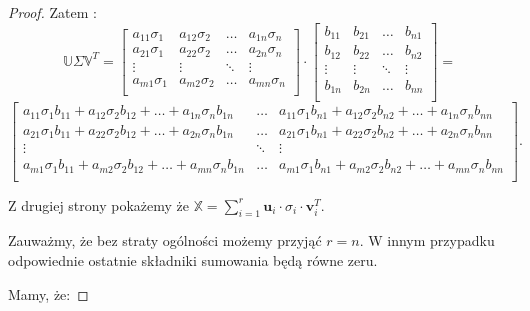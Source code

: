 \documentclass[12pt,a4paper]{report}
\begin{document}
\begin{proof}
Zatem :
$$\mathbb{U} \Sigma \mathbb{V}^T = \left[
        \begin{array}{cccc}
         a_{11} \sigma_{1} & a_{12} \sigma_{2} & \ldots & a_{1n} \sigma_{n} \\
         a_{21} \sigma_{1} & a_{22} \sigma_{2} & \ldots & a_{2n} \sigma_{n}\\
         \vdots & \vdots & \ddots & \vdots \\
         a_{m1} \sigma_{1} & a_{m2} \sigma_{2} & \ldots & a_{mn} \sigma_{n} \\
         \end{array}
      \right] \cdot \left[
        \begin{array}{cccc}
         b_{11} & b_{21} & \ldots & b_{n1}  \\
         b_{12} & b_{22} & \ldots & b_{n2} \\
         \vdots & \vdots & \ddots & \vdots \\
         b_{1n} & b_{2n} & \ldots & b_{nn} \\
         \end{array}
      \right] = 
      $$
      $$\left[
        \begin{array}{ccc}
a_{11} \sigma_{1} b_{11} + a_{12} \sigma_{2} b_{12} + \ldots + a_{1n} \sigma_{n} b_{1n} & \ldots &  a_{11} \sigma_{1} b_{n1} + a_{12} \sigma_{2} b_{n2} + \ldots + a_{1n} \sigma_{n} b_{nn} \\
a_{21} \sigma_{1} b_{11} + a_{22} \sigma_{2} b_{12} + \ldots + a_{2n} \sigma_{n} b_{1n} & \ldots & a_{21} \sigma_{1} b_{n1} + a_{22} \sigma_{2} b_{n2} + \ldots + a_{2n} \sigma_{n} b_{nn} \\
         \vdots & \ddots & \vdots \\
a_{m1} \sigma_{1} b_{11} + a_{m2} \sigma_{2} b_{12} + \ldots + a_{mn} \sigma_{n} b_{1n} & \ldots & a_{m1} \sigma_{1} b_{n1} + a_{m2} \sigma_{2} b_{n2} + \ldots + a_{mn} \sigma_{n} b_{nn} \\
         \end{array}
      \right].$$
      
Z drugiej strony pokażemy że $\mathbb{X} = \sum_{i=1}^r \mathbf{u}_i \cdot\sigma_{i} \cdot \mathbf{v}_i^T$.

Zauważmy, że bez straty ogólności możemy przyjąć $r=n$. W innym przypadku odpowiednie ostatnie składniki sumowania będą równe zeru.

Mamy, że:


\end{proof}
\end{document}
